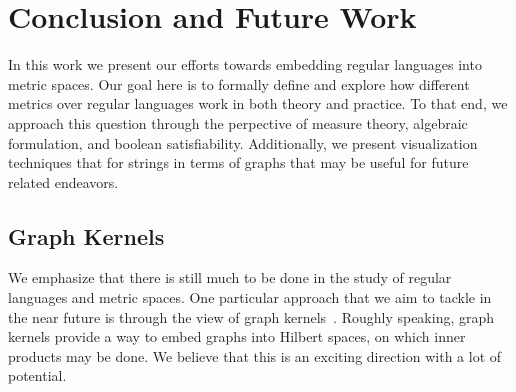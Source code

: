 
\section{Conclusion and Future Work}

In this work we present our efforts towards embedding regular languages
into metric spaces.
Our goal here is to formally define and explore how different metrics
over regular languages work in both theory and practice.
To that end, we approach this question through the perpective of
measure theory, algebraic formulation, and boolean satisfiability.
Additionally, we present visualization techniques that for strings
in terms of graphs that may be useful for future related endeavors.


\subsection{Graph Kernels}
We emphasize that there is still much to be done in the study of
regular languages and metric spaces.
One particular approach that we aim to tackle in the near future
is through the view of graph kernels~\cite{vishwanathan2010graph}.
Roughly speaking, graph kernels provide a way to embed graphs
into Hilbert spaces, on which inner products may be done.
We believe that this is an exciting direction with a lot of potential.


